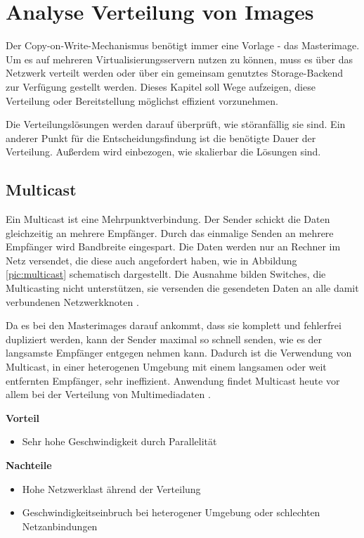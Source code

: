 \chapter{Analyse Verteilung von Images}\label{verteilung}
Der Copy-on-Write-Mechanismus benötigt immer eine Vorlage - das Masterimage. Um es auf mehreren Virtualisierungsservern nutzen zu können, muss es über das Netzwerk verteilt werden oder über ein gemeinsam genutztes Storage-Backend zur Verfügung gestellt werden. Dieses Kapitel soll Wege aufzeigen, diese Verteilung oder Bereitstellung möglichst effizient vorzunehmen.

Die Verteilungslösungen werden darauf überprüft, wie störanfällig sie sind. Ein anderer Punkt für die Entscheidungsfindung ist die benötigte Dauer der Verteilung. Außerdem wird einbezogen, wie skalierbar die Lösungen sind.

\section{Multicast}
Ein Multicast ist eine Mehrpunktverbindung. Der Sender schickt die Daten gleichzeitig an mehrere Empfänger. Durch das einmalige Senden an mehrere Empfänger wird Bandbreite eingespart. Die Daten werden nur an Rechner im Netz versendet, die diese auch angefordert haben, wie in Abbildung \ref{pic:multicast} schematisch dargestellt. Die Ausnahme bilden Switches, die Multicasting nicht unterstützen, sie versenden die gesendeten Daten an alle damit verbundenen Netzwerkknoten \cite{multicasttech}. 

Da es bei den Masterimages darauf ankommt, dass sie komplett und fehlerfrei dupliziert werden, kann der Sender maximal so schnell senden, wie es der langsamste Empfänger entgegen nehmen kann.  Dadurch ist die Verwendung von Multicast, in einer heterogenen Umgebung mit einem langsamen oder weit entfernten Empfänger, sehr ineffizient. Anwendung findet Multicast heute vor allem bei der Verteilung von Multimediadaten \cite{multicastfefe}. 


\textbf{Vorteil}
\begin{itemize}
 \item Sehr hohe Geschwindigkeit durch Parallelität
\end{itemize}

\textbf{Nachteile}
\begin{itemize}
 \item Hohe Netzwerklast ährend der Verteilung
 \item Geschwindigkeitseinbruch bei heterogener Umgebung oder schlechten Netzanbindungen
\end{itemize}

